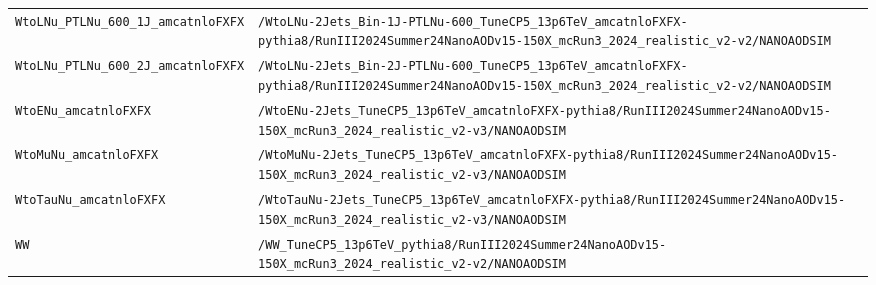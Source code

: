 \begin{longtable}{@{}>{\RaggedRight\arraybackslash}p{} >{\RaggedRight\arraybackslash}p{}@{}}
\addlinespace[2pt]
\texttt{WtoLNu\_\allowbreak{}PTLNu\_\allowbreak{}600\_\allowbreak{}1J\_\allowbreak{}amcatnloFXFX} & \texttt{/\allowbreak{}WtoLNu-\allowbreak{}2Jets\_\allowbreak{}Bin-\allowbreak{}1J-\allowbreak{}PTLNu-\allowbreak{}600\_\allowbreak{}TuneCP5\_\allowbreak{}13p6TeV\_\allowbreak{}amcatnloFXFX-\allowbreak{}pythia8/\allowbreak{}RunIII2024Summer24NanoAODv15-\allowbreak{}150X\_\allowbreak{}mcRun3\_\allowbreak{}2024\_\allowbreak{}realistic\_\allowbreak{}v2-\allowbreak{}v2/\allowbreak{}NANOAODSIM} \\
\addlinespace[2pt]
\texttt{WtoLNu\_\allowbreak{}PTLNu\_\allowbreak{}600\_\allowbreak{}2J\_\allowbreak{}amcatnloFXFX} & \texttt{/\allowbreak{}WtoLNu-\allowbreak{}2Jets\_\allowbreak{}Bin-\allowbreak{}2J-\allowbreak{}PTLNu-\allowbreak{}600\_\allowbreak{}TuneCP5\_\allowbreak{}13p6TeV\_\allowbreak{}amcatnloFXFX-\allowbreak{}pythia8/\allowbreak{}RunIII2024Summer24NanoAODv15-\allowbreak{}150X\_\allowbreak{}mcRun3\_\allowbreak{}2024\_\allowbreak{}realistic\_\allowbreak{}v2-\allowbreak{}v2/\allowbreak{}NANOAODSIM} \\
\addlinespace[2pt]
\texttt{WtoENu\_\allowbreak{}amcatnloFXFX} & \texttt{/\allowbreak{}WtoENu-\allowbreak{}2Jets\_\allowbreak{}TuneCP5\_\allowbreak{}13p6TeV\_\allowbreak{}amcatnloFXFX-\allowbreak{}pythia8/\allowbreak{}RunIII2024Summer24NanoAODv15-\allowbreak{}150X\_\allowbreak{}mcRun3\_\allowbreak{}2024\_\allowbreak{}realistic\_\allowbreak{}v2-\allowbreak{}v3/\allowbreak{}NANOAODSIM} \\
\addlinespace[2pt]
\texttt{WtoMuNu\_\allowbreak{}amcatnloFXFX} & \texttt{/\allowbreak{}WtoMuNu-\allowbreak{}2Jets\_\allowbreak{}TuneCP5\_\allowbreak{}13p6TeV\_\allowbreak{}amcatnloFXFX-\allowbreak{}pythia8/\allowbreak{}RunIII2024Summer24NanoAODv15-\allowbreak{}150X\_\allowbreak{}mcRun3\_\allowbreak{}2024\_\allowbreak{}realistic\_\allowbreak{}v2-\allowbreak{}v3/\allowbreak{}NANOAODSIM} \\
\addlinespace[2pt]
\texttt{WtoTauNu\_\allowbreak{}amcatnloFXFX} & \texttt{/\allowbreak{}WtoTauNu-\allowbreak{}2Jets\_\allowbreak{}TuneCP5\_\allowbreak{}13p6TeV\_\allowbreak{}amcatnloFXFX-\allowbreak{}pythia8/\allowbreak{}RunIII2024Summer24NanoAODv15-\allowbreak{}150X\_\allowbreak{}mcRun3\_\allowbreak{}2024\_\allowbreak{}realistic\_\allowbreak{}v2-\allowbreak{}v3/\allowbreak{}NANOAODSIM} \\
\addlinespace[2pt]
\texttt{WW} & \texttt{/\allowbreak{}WW\_\allowbreak{}TuneCP5\_\allowbreak{}13p6TeV\_\allowbreak{}pythia8/\allowbreak{}RunIII2024Summer24NanoAODv15-\allowbreak{}150X\_\allowbreak{}mcRun3\_\allowbreak{}2024\_\allowbreak{}realistic\_\allowbreak{}v2-\allowbreak{}v2/\allowbreak{}NANOAODSIM} \\

\end{longtable}
